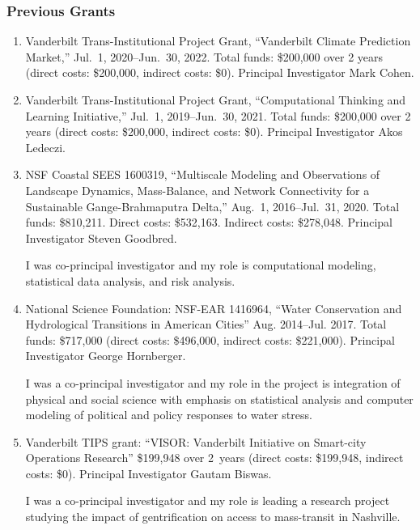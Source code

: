 \subsubsection{Previous Grants}
\begin{enumerate}
%
%
%
\item Vanderbilt Trans-Institutional Project Grant,
``Vanderbilt Climate Prediction Market,''
Jul.~1, 2020--Jun.~30, 2022.
Total funds: \$200,000 over 2 years (direct costs: \$200,000, indirect costs: \$0).
Principal Investigator Mark Cohen.

\item Vanderbilt Trans-Institutional Project Grant,
``Computational Thinking and Learning Initiative,''
Jul.~1, 2019--Jun.~30, 2021.
Total funds: \$200,000 over 2 years (direct costs: \$200,000, indirect costs: \$0).
Principal Investigator Akos Ledeczi.
%
\item NSF Coastal SEES 1600319,
``Multiscale Modeling and Observations of Landscape Dynamics, Mass-Balance, and Network Connectivity for a Sustainable Gange-Brahmaputra Delta,''
Aug.~1, 2016--Jul.~31, 2020.
Total funds: \$810,211. Direct costs: \$532,163. Indirect costs: \$278,048.
Principal Investigator Steven Goodbred.
\begin{credit}
I was co-principal investigator and my role is computational modeling, statistical data analysis, and risk analysis.
\end{credit}
%
%
\item National Science Foundation: NSF-EAR 1416964,
``Water Conservation and Hydrological Transitions in American Cities''
Aug. 2014--Jul. 2017.
Total funds: \$717,000 (direct costs: \$496,000, indirect costs: \$221,000).
Principal Investigator George Hornberger.
\begin{credit}
I was a co-principal investigator and my role in the project is integration of physical and social science with emphasis on statistical analysis and
computer modeling of political and policy responses to water stress.
\end{credit}
%
%
\item Vanderbilt TIPS grant: ``VISOR: Vanderbilt Initiative on Smart-city Operations Research'' \$199,948 over 2~years (direct costs: \$199,948, indirect costs: \$0). Principal Investigator Gautam Biswas.
\begin{credit}
I was a co-principal investigator and my role is leading a research project studying the impact of gentrification on access to mass-transit in Nashville.
\end{credit}

\end{enumerate}
